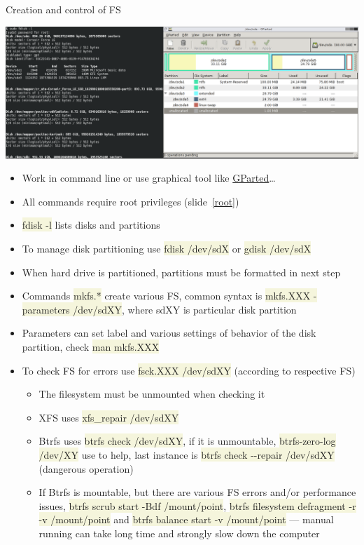 \documentclass[compress, xelatex, 11pt, xcolor=svgnames, aspectratio=169,
	hyperref={
		bookmarks=true,
		unicode=true,
		colorlinks=true,
		pdftitle={Linux, command line and MetaCentrum},
		plainpages=false,
		pdfauthor={Vojtech Zeisek},
		pdfsubject={Course about use of Linux command line, writing shell scripts and using MetaCentrum of CESNET},
		pdfcreator={XeLaTeX},
		pdfkeywords={Linux, GNU, BASH, shell, command line, MetaCentrum},
		linkcolor=DarkRed, %
		anchorcolor=DarkBlue, %
		citecolor=Indigo, %
		filecolor=NavyBlue, %
		menucolor=DarkMagenta, %
		urlcolor=DarkBlue, %
		},
	url={hyphens, lowtilde} %
	]{beamer}
\renewcommand{\texttt}[1]{\colorbox{Beige}{{\ttfamily #1}}}
\begin{document}
\begin{frame}[allowframebreaks]{Creation and control of FS}
	\begin{center}
		\includegraphics[width=\textwidth]{disks.png}
	\end{center}
	\begin{itemize}
		\item Work in command line or use graphical tool like \href{https://gparted.org/}{GParted}\ldots
		\item All commands require root privileges (slide~\ref{root})
		\item \texttt{fdisk -l} lists disks and partitions
		\item To manage disk partitioning use \texttt{fdisk /dev/sdX} or \texttt{gdisk /dev/sdX}
		\item When hard drive is partitioned, partitions must be formatted in next step
		\item Commands \texttt{mkfs.*} create various FS, common syntax is \texttt{mkfs.XXX -parameters /dev/sdXY}, where sdXY is particular disk partition
		\item Parameters can set label and various settings of behavior of the disk partition, check \texttt{man mkfs.XXX}
		\item To check FS for errors use \texttt{fsck.XXX /dev/sdXY} (according to respective FS)
		\begin{itemize}
			\item The filesystem must be unmounted when checking it
			\item XFS uses \texttt{xfs\_repair /dev/sdXY}
			\item Btrfs uses \texttt{btrfs check /dev/sdXY}, if it is unmountable, \texttt{btrfs-zero-log /dev/XY} use to help, last instance is \texttt{btrfs check -{-}repair /dev/sdXY} (dangerous operation)
			\item If Btrfs is mountable, but there are various FS errors and/or performance issues, \texttt{btrfs scrub start -Bdf /mount/point}, \texttt{btrfs filesystem defragment -r -v /mount/point} and \texttt{btrfs balance start -v /mount/point} --- manual running can take long time and strongly slow down the computer

\end{itemize}
\end{itemize}
\end{frame}
\end{document}
